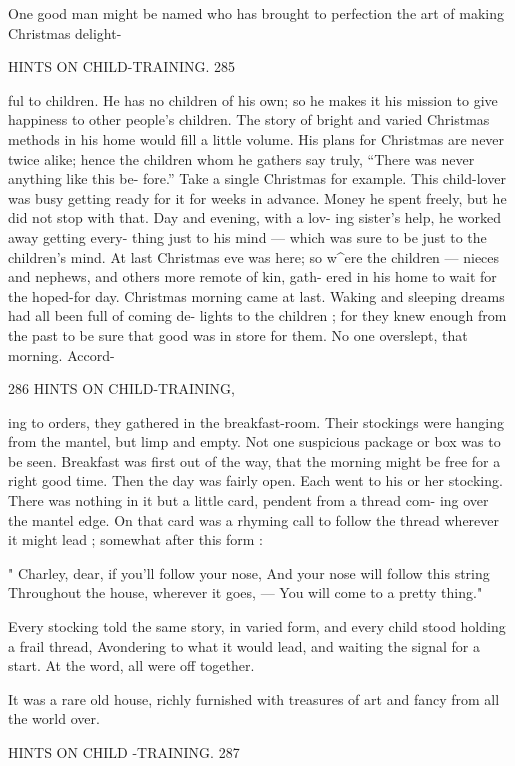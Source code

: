 \documentclass[
]{book}
\begin{document}
One good man might be named who has brought to perfection the art of making Christmas delight-

HINTS ON CHILD-TRAINING. 285

ful to children. He has no children of his own; so he makes it his mission to give happiness to other people's children. The story of bright and varied Christmas methods in his home would fill a little volume. His plans for Christmas are never twice alike; hence the children whom he gathers say truly, ``There was never anything like this be- fore.'' Take a single Christmas for example. This child-lover was busy getting ready for it for weeks in advance. Money he spent freely, but he did not stop with that. Day and evening, with a lov- ing sister's help, he worked away getting every- thing just to his mind --- which was sure to be just to the children's mind. At last Christmas eve was here; so w\^{}ere the children --- nieces and nephews, and others more remote of kin, gath- ered in his home to wait for the hoped-for day. Christmas morning came at last. Waking and sleeping dreams had all been full of coming de- lights to the children ; for they knew enough from the past to be sure that good was in store for them. No one overslept, that morning. Accord-

286 HINTS ON CHILD-TRAINING,

ing to orders, they gathered in the breakfast-room. Their stockings were hanging from the mantel, but limp and empty. Not one suspicious package or box was to be seen. Breakfast was first out of the way, that the morning might be free for a right good time. Then the day was fairly open. Each went to his or her stocking. There was nothing in it but a little card, pendent from a thread com- ing over the mantel edge. On that card was a rhyming call to follow the thread wherever it might lead ; somewhat after this form :

" Charley, dear, if you'll follow your nose, And your nose will follow this string Throughout the house, wherever it goes, --- You will come to a pretty thing."

Every stocking told the same story, in varied form, and every child stood holding a frail thread, Avondering to what it would lead, and waiting the signal for a start. At the word, all were off together.

It was a rare old house, richly furnished with treasures of art and fancy from all the world over.

HINTS ON CHILD -TRAINING. 287
\end{document}

